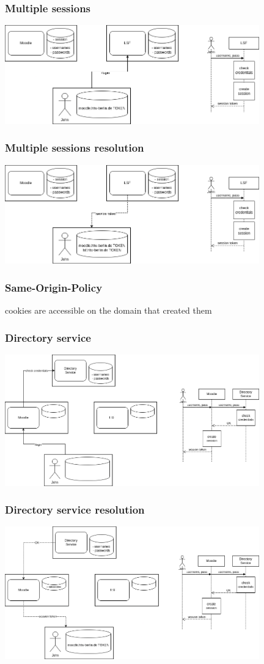 \documentclass{beamer}
\begin{document}
\begin{frame}
  \frametitle{Multiple sessions}
    \includegraphics[width=11cm]{multi session}
\end{frame}

\begin{frame}
  \frametitle{Multiple sessions resolution}
    \includegraphics[width=11cm]{multi session resolution}
\end{frame}

\begin{frame}
  \frametitle{Same-Origin-Policy}

  cookies are accessible on the domain that created them
\end{frame}

\begin{frame}
  \frametitle{Directory service}
    \includegraphics[width=11cm]{directory service}
\end{frame}

\begin{frame}
  \frametitle{Directory service resolution}
    \includegraphics[width=11cm]{directory service resolution}
\end{frame}
\end{document}
